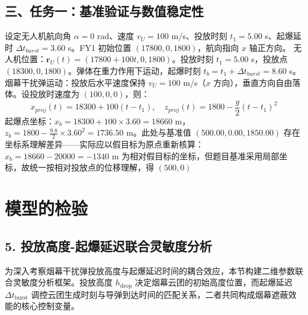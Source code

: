 \documentclass{JXUSTmodeling}
\begin{document}
\subsection{三、任务一：基准验证与数值稳定性}
设定无人机航向角 $\alpha=0$ rad、速度 $v_U=100$ m/s、投放时刻 $t_1=5.00$ s、起爆延时 $\Delta t_{burst}=3.60$ s。FY1 初始位置 $(17800, 0, 1800)$，航向指向 $x$ 轴正方向。
无人机位置：$\mathbf{r}_U(t)=(17800+100t, 0, 1800)$。投放时刻 $t_1=5.00$ s，投放点 $(18300, 0, 1800)$。弹体在重力作用下运动，起爆时刻 $t_b=t_1+\Delta t_{burst}=8.60$ s。
烟幕干扰弹运动：投放后水平速度保持 $v_U=100$ m/s（$x$ 方向），垂直方向自由落体。设投放时速度为 $(100, 0, 0)$，则：
\begin{equation}
x_{proj}(t)=18300+100(t-t_1), \quad z_{proj}(t)=1800-\frac{g}{2}(t-t_1)^2 \tag{15}
\end{equation}
起爆点坐标：$x_b=18300+100\times3.60=18660$ m，$z_b=1800-\frac{9.8}{2}\times3.60^2=1736.50$ m。此处与基准值 $(500.00, 0.00, 1850.00)$ 存在坐标系理解差异——实际应以假目标为原点重新核算：$x_b=18660-20000=-1340$ m 为相对假目标的坐标，但题目基准采用局部坐标，故统一按相对投放点的位移理解，得 $(500, 0)$
\section{模型的检验}
\subsection{5. 投放高度-起爆延迟联合灵敏度分析}
为深入考察烟幕干扰弹投放高度与起爆延迟时间的耦合效应，本节构建二维参数联合灵敏度分析框架。投放高度 $h_{\mathrm{drop}}$ 决定烟幕云团的初始高度位置，而起爆延迟 $\Delta t_{\mathrm{burst}}$ 调控云团生成时刻与导弹到达时间的匹配关系，二者共同构成烟幕遮蔽效能的核心控制变量。
\end{document}
